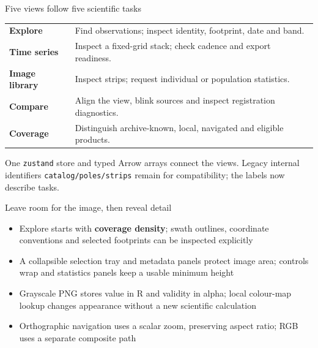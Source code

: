 \documentclass[aspectratio=169,11pt]{beamer}
\newcommand{\currevsec}{}
\newcommand{\revsec}[1]{\gdef\currevsec{#1}}
\begin{document}
\begin{frame}{Five views follow five scientific tasks}
  \revsec{4.16}
\small
  \begin{tabular}{lp{9.8cm}}
    \toprule
    \textbf{Explore} & Find observations; inspect identity, footprint, date and band. \\
    \textbf{Time series} & Inspect a fixed-grid stack; check cadence and export readiness. \\
    \textbf{Image library} & Inspect strips; request individual or population statistics. \\
    \textbf{Compare} & Align the view, blink sources and inspect registration diagnostics. \\
    \textbf{Coverage} & Distinguish archive-known, local, navigated and eligible products. \\
    \bottomrule
  \end{tabular}\par
  \vspace{0.3cm}
  One \texttt{zustand} store and typed Arrow arrays connect the views. Legacy internal identifiers \texttt{catalog/poles/strips} remain for compatibility; the labels now describe tasks.
\end{frame}

\begin{frame}{Leave room for the image, then reveal detail}
  \revsec{4.16}
\begin{itemize}
    \item Explore starts with \textbf{coverage density}; swath outlines, coordinate conventions and selected footprints can be inspected explicitly
    \item A collapsible selection tray and metadata panels protect image area; controls wrap and statistics panels keep a usable minimum height
    \item Grayscale PNG stores value in R and validity in alpha; local colour-map lookup changes appearance without a new scientific calculation
    \item Orthographic navigation uses a scalar zoom, preserving aspect ratio; RGB uses a separate composite path
  \end{itemize}
\end{frame}
\end{document}
